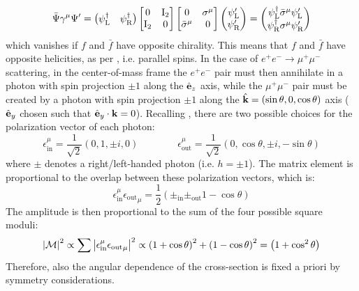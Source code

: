 \begin{equation*}
  \bar{\Psi} \gamma^\mu \Psi' =
  \begin{pmatrix}
    \psi_\text{L}^\dagger & \psi_\text{R}^\dagger
  \end{pmatrix}
  \begin{bmatrix}
    0 & \mathrm{I}_2 \\
    \mathrm{I}_2 & 0
  \end{bmatrix}
  \begin{bmatrix}
    0 & \sigma^\mu \\
    \bar{\sigma}^\mu & 0
  \end{bmatrix}
  \begin{pmatrix}
    \psi_\text{L}' \\
    \psi_\text{R}'
  \end{pmatrix}
  =
  \begin{pmatrix}
    \psi_\text{L}^\dagger \bar{\sigma}^\mu \psi_\text{L}' \\
    \psi_\text{R}^\dagger \sigma^\mu \psi_\text{R}'
  \end{pmatrix}
\end{equation*}
which vanishes if $ f $ and $ \bar{f} $ have opposite chirality. This means that $ f $ and $ \bar{f} $ have opposite helicities, as per , i.e. parallel spins. In the case of $ e^+ e^- \rightarrow \mu^+ \mu^- $ scattering, in the center-of-mass frame the $ e^+ e^- $ pair must then annihilate in a photon with spin projection $ \pm 1 $ along the $ \hat{\mathbf{e}}_z $ axis, while the $ \mu^+ \mu^- $ pair must be created by a photon with spin projection $ \pm 1 $ along the $ \hat{\mathbf{k}} = (\sin \theta , 0 , \cos \theta) $ axis ($ \hat{\mathbf{e}}_y $ chosen such that $ \hat{\mathbf{e}}_y \cdot \mathbf{k} = 0 $). Recalling , there are two possible choices for the polarization vector of each photon:
\begin{equation*}
  \epsilon^\mu_\text{in} = \frac{1}{\sqrt{2}} (0, 1, \pm i, 0)
  \qquad \qquad
  \epsilon^\mu_\text{out} = \frac{1}{\sqrt{2}} (0, \cos \theta, \pm i, -\sin \theta)
\end{equation*}
where $ \pm $ denotes a right/left-handed photon (i.e. $ h = \pm 1 $).
The matrix element is proportional to the overlap between these polarization vectors, which is:
\begin{equation*}
  \epsilon^\mu_\text{in} {\epsilon_\text{out}}_\mu = \frac{1}{2} \left( \pm_\text{in} \pm_\text{out} 1 - \cos \theta \right)
\end{equation*}
The amplitude is then proportional to the sum of the four possible square moduli:
\begin{equation}
  \left\lvert\mathcal{M}\right\rvert^2 \propto \sum \left\lvert\epsilon^\mu_\text{in} {\epsilon_\text{out}}_\mu\right\rvert^2 \propto \left( 1 + \cos \theta \right)^2 + \left( 1 - \cos \theta \right)^2 = \left( 1 + \cos^2 \theta \right)
\end{equation}
Therefore, also the angular dependence of the cross-section is fixed a priori by symmetry considerations.











